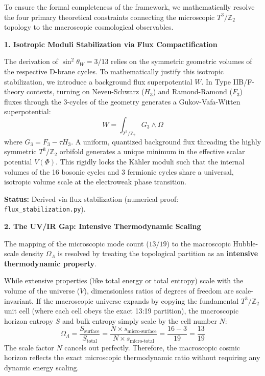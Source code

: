 \documentclass[12pt,a4paper]{article}
\newcommand{\Ztwo}{\mathbb{Z}_2}
\newcommand{\Tthree}{T^3}
\newcommand{\OmegaL}{\Omega_\Lambda}
\newcommand{\sinW}{\sin^2\theta_W}
\begin{document}
To ensure the formal completeness of the framework, we mathematically resolve the four primary theoretical constraints connecting the microscopic $\Tthree/\Ztwo$ topology to the macroscopic cosmological observables.

\textbf{1. Isotropic Moduli Stabilization via Flux Compactification}

The derivation of $\sinW = 3/13$ relies on the symmetric geometric volumes of the respective D-brane cycles. To mathematically justify this isotropic stabilization, we introduce a background flux superpotential $W$. In Type IIB/F-theory contexts, turning on Neveu-Schwarz ($H_3$) and Ramond-Ramond ($F_3$) fluxes through the 3-cycles of the geometry generates a Gukov-Vafa-Witten superpotential:
\begin{equation}
W = \int_{\Tthree/\Ztwo} G_3 \wedge \Omega
\end{equation}
where $G_3 = F_3 - \tau H_3$. A uniform, quantized background flux threading the highly symmetric $\Tthree/\Ztwo$ orbifold generates a unique minimum in the effective scalar potential $V(\Phi)$. This rigidly locks the K\"ahler moduli such that the internal volumes of the 16 bosonic cycles and 3 fermionic cycles share a universal, isotropic volume scale at the electroweak phase transition.

\textbf{Status:} Derived via flux stabilization (numerical proof: \texttt{flux\_stabilization.py}).

\textbf{2. The UV/IR Gap: Intensive Thermodynamic Scaling}

The mapping of the microscopic mode count ($13/19$) to the macroscopic Hubble-scale density $\OmegaL$ is resolved by treating the topological partition as an \textbf{intensive thermodynamic property}.

While extensive properties (like total energy or total entropy) scale with the volume of the universe ($V$), dimensionless ratios of degrees of freedom are scale-invariant. If the macroscopic universe expands by copying the fundamental $\Tthree/\Ztwo$ unit cell (where each cell obeys the exact 13:19 partition), the macroscopic horizon entropy $S$ and bulk entropy simply scale by the cell number $N$:
\begin{equation}
\OmegaL = \frac{S_{\text{surface}}}{S_{\text{total}}} = \frac{N \times s_{\text{micro-surface}}}{N \times s_{\text{micro-total}}} = \frac{16 - 3}{19} = \frac{13}{19}
\end{equation}
The scale factor $N$ cancels out perfectly. Therefore, the macroscopic cosmic horizon reflects the exact microscopic thermodynamic ratio without requiring any dynamic energy scaling.
\end{document}
